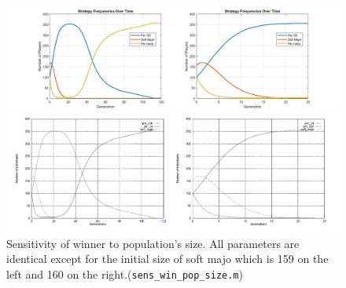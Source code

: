 \begin{figure}[ht!]
	\centering
	\begin{minipage}{1\textwidth}
		\includegraphics[width=1\linewidth]{fit_plots_theoretical/sensitivity_of_winner_to_popsize}
		
		
	\end{minipage}
	\begin{minipage}{1\textwidth}
		\includegraphics[width=1\linewidth]{sens_winner}
	\end{minipage}
	\caption{Sensitivity of winner to population's size. All parameters are identical except
		for the initial size of soft majo which is 159 on the left and 160 on the right.(\texttt{sens\_win\_pop\_size.m})}
\end{figure}

